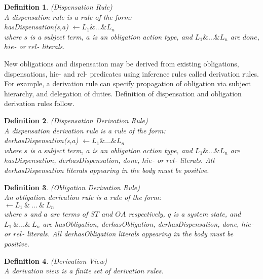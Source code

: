\documentclass[12pt,journal,letterpaper,onecolumn]{IEEEtran}
\newtheorem{definition}{Definition}[section]
\begin{document}
\begin{definition}(Dispensation Rule)\\
A {\em dispensation rule} is a rule of the form: \\
{\ttfamily hasDispensation(s,a)} $\leftarrow L_1 \& \ldots \& L_n$ \\
where $s$ is a subject term, $a$ is an obligation action type, and
$L_1 \& \ldots \& L_n$ are $done$, $hie$- or $rel$- literals.
\label{def:dispensationrule}
\end{definition}

New obligations and dispensation may be derived from existing
obligations, dispensations, hie- and rel- predicates using inference
rules called derivation rules. For example, a derivation rule can
specify propagation of obligation via subject hierarchy, and
delegation of duties. Definition of dispensation and obligation
derivation rules follow.

\begin{definition}(Dispensation Derivation Rule)\\
A {\em dispensation derivation rule} is a rule of the form: \\
{\ttfamily derhasDispensation(s,a)} $\leftarrow L_1 \& \ldots \& L_n$ \\
where $s$ is a subject term, $a$ is an obligation action type, and
$L_1 \& \ldots \& L_n$ are {\ttfamily hasDispensation,
derhasDispensation, done}, $hie$- or $rel$- literals. All {\ttfamily
derhasDispensation} literals appearing in the body must be positive.
\label{def:derdispensationrule}
\end{definition}



\begin{definition}(Obligation Derivation Rule)\\
An {\em obligation derivation rule} is a rule of the form: \\
 $\leftarrow L_1~\&~\ldots~\&~L_n$\\
where $s$ and $a$ are terms of $ST$ and $OA$ respectively, $q$ is a
system state, and $L_1~\&\ldots\&~L_n$ are {\ttfamily hasObligation,
derhasObligation, derhasDispensation, done}, $hie$- or $rel$-
literals. All {\ttfamily derhasObligation} literals appearing in the
body must be positive.\label{def:derivationrule}
\end{definition}

\begin{definition}(Derivation View)\\
A derivation view is a finite set of derivation rules.
\end{definition}
\end{document}
